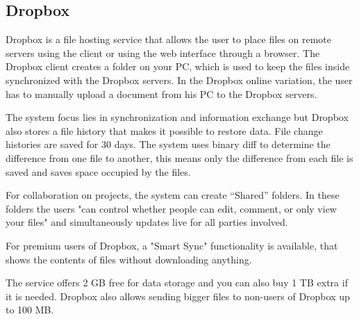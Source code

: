 \subsection{Dropbox}
Dropbox is a file hosting service that allows the user to place files on remote servers using the client or using the web interface through a browser.
The Dropbox client creates a folder on your PC, which is used to keep the files inside synchronized with the Dropbox servers. In the Dropbox online variation, the user has to manually upload a document from his PC to the Dropbox servers. 

The system focus lies in synchronization and information exchange but Dropbox also stores a file history that makes it possible to restore data.
File change histories are saved for 30 days. 
The system uses binary diff to determine the difference from one file to another, this means only the difference from each file is saved and saves space occupied by the files.\cite{DropboxDiff}

For collaboration on projects, the system can create “Shared” folders. In these folders the users "can control whether people can edit, comment, or only view your files" and simultaneously updates live for all parties involved.\cite{DropboxShared}

For premium users of Dropbox, a "Smart Sync" functionality is available, that shows the contents of files without downloading anything.\cite{DropboxSmartSync}
 
The service offers 2 GB free for data storage and you can also buy 1 TB extra if it is needed. Dropbox also allows sending bigger files to non-users of Dropbox up to 100 MB.\cite{DropboxContents}